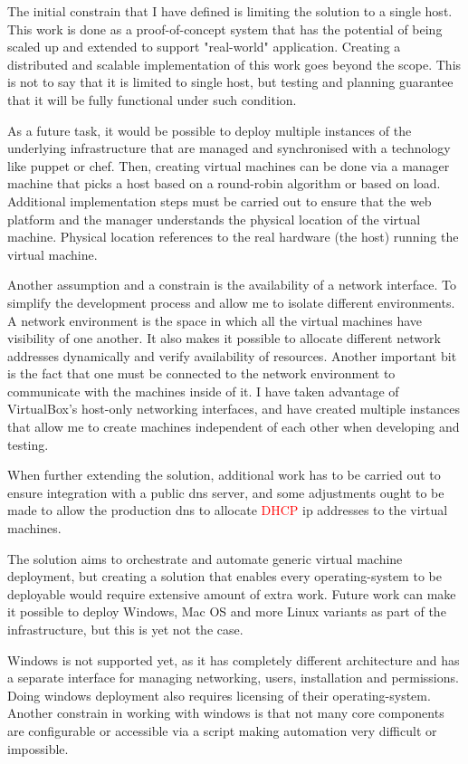 \documentclass{article}
\begin{document}
The initial constrain that I have defined is limiting the solution to a single host. This work is done as a proof-of-concept system that has the potential of being scaled up and extended to support "real-world" application.
Creating a distributed and scalable implementation of this work goes beyond the scope. This is not to say that it is limited to single host, but testing and planning guarantee that it will be fully functional under such condition.

As a future task, it would be possible to deploy multiple instances of the underlying infrastructure that are managed and synchronised with a technology like puppet or chef. Then, creating virtual machines can be done via a manager machine that picks a host based on a round-robin algorithm or based on load. Additional implementation steps must be carried out to ensure that the web platform and the manager understands the physical location of the virtual machine. Physical location references to the real hardware (the host) running the virtual machine.

Another assumption and a constrain is the availability of a network interface. To simplify the development process and allow me to isolate different environments. A network environment is the space in which all the virtual machines have visibility of one another. It also makes it possible to allocate different network addresses dynamically and verify availability of resources. Another important bit is the fact that one must be connected to the network environment to communicate with the machines inside of it. I have taken advantage of VirtualBox's host-only networking interfaces, and have created multiple instances that allow me to create machines independent of each other when developing and testing.

When further extending the solution, additional work has to be carried out to ensure integration with a public \gls{dns} server, and some adjustments ought to be made to allow the production \gls{dns} to allocate \textcolor{red}{DHCP} ip addresses to the virtual machines.

The solution aims to orchestrate and automate generic virtual machine deployment, but creating a solution that enables every \gls{operating-system} to be deployable would require extensive amount of extra work. Future work can make it possible to deploy Windows, Mac OS and more Linux variants as part of the infrastructure, but this is yet not the case.

Windows is not supported yet, as it has completely different architecture and has a separate interface for managing networking, users, installation and permissions. Doing windows deployment also requires licensing of their \gls{operating-system}. Another constrain in working with windows is that not many core components are configurable or accessible via a script making automation very difficult or impossible.
\end{document}
